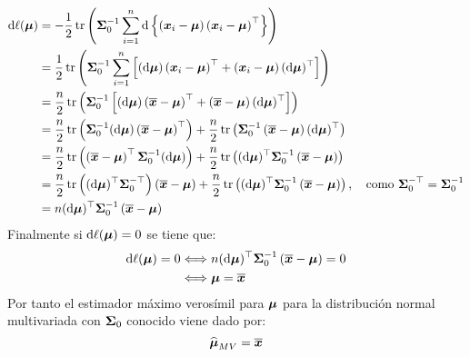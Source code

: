 \begin{align*}
\de \ell(\bf{\mu}) 
&= - \dfrac{1}{2} \tr\parcurvo{
    \bf{\Sigma}_0^{-1} \suma \de\parllave{
        \parcurvo{
\bf{x}_i - \bf{\mu}
}\parcurvo{
\bf{x}_i - \bf{\mu}
}^\top
    }
}\\
&= \dfrac{1}{2} \tr\parcurvo{
    \bf{\Sigma}_0^{-1} \suma \parcerrado{(\de \bf{\mu}) \parcurvo{
\bf{x}_i - \bf{\mu}
}^\top + \parcurvo{
\bf{x}_i - \bf{\mu}
}(\de \bf{\mu})^\top}
    }\\
    &= \dfrac{n}{2} \tr\parcurvo{
        \bf{\Sigma}_0^{-1}  \parcerrado{(\de \bf{\mu}) \parcurvo{
\bf{\barra{x}} - \bf{\mu}
}^\top + \parcurvo{
\bf{\barra{x}} - \bf{\mu}
}(\de \bf{\mu})^\top}
    }\\
    &= \dfrac{n}{2} \tr\parcurvo{
    \bf{\Sigma}_0^{-1}  (\de \bf{\mu}) \parcurvo{
\bf{\barra{x}} - \bf{\mu}
}^\top
    }+\dfrac{n}{2} \tr\parcurvo{
    \bf{\Sigma}_0^{-1} \parcurvo{
\bf{\barra{x}} - \bf{\mu}
}(\de \bf{\mu})^\top
    }\\
    &= \dfrac{n}{2} \tr\parcurvo{
    \parcurvo{
\bf{\barra{x}} - \bf{\mu}
}^\top\bf{\Sigma}_0^{-1}  (\de \bf{\mu}) 
    }+\dfrac{n}{2} \tr\parcurvo{(\de \bf{\mu})^\top
    \bf{\Sigma}_0^{-1} \parcurvo{
\bf{\barra{x}} - \bf{\mu}
}
    }\\
&=\dfrac{n}{2} \tr\parcurvo{
     (\de \bf{\mu})^\top\bf{\Sigma}_0^{-\top}  
    }\parcurvo{
\bf{\barra{x}} - \bf{\mu}
}+\dfrac{n}{2} \tr\parcurvo{(\de \bf{\mu})^\top
    \bf{\Sigma}_0^{-1} \parcurvo{
\bf{\barra{x}} - \bf{\mu}
}
    },\quad \text{como }\bf{\Sigma}_0^{-\top}=\bf{\Sigma}_0^{-1}\\
&= n (\de \bf{\mu})^\top
    \bf{\Sigma}_0^{-1} \parcurvo{
\bf{\barra{x}} - \bf{\mu}
}
\end{align*}
Finalmente si $\de \ell (\bf{\mu}) = 0$ se tiene que:
\begin{align*}
\de \ell (\bf{\mu}) = 0 &\ssi n (\de \bf{\mu})^\top
    \bf{\Sigma}_0^{-1} \parcurvo{
\bf{\barra{x}} - \bf{\mu}
} = 0\\
&\ssi \bf{\mu} = \bf{\barra{x}}
\end{align*}
Por tanto el estimador máximo verosímil para $\bf{\mu}$ para la distribución normal multivariada con $\bf{\Sigma}_0$ conocido viene dado por:
$$
\gorro{\bf{\mu}}_{MV}= \bf{\barra{x}}
$$


